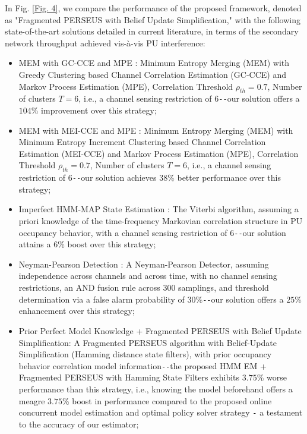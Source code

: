 \documentclass[12pt, draftcls, onecolumn]{IEEEtran}
\begin{document}
In Fig. \ref{Fig. 4}, we compare the performance of the proposed framework, denoted as "Fragmented PERSEUS with Belief Update Simplification," with the following state-of-the-art solutions detailed in current literature, in terms of the secondary network throughput achieved vis-à-vis PU interference:
\begin{itemize}
    \item MEM with GC-CCE and MPE \cite{WCL:7}: Minimum Entropy Merging (MEM) with Greedy Clustering based Channel Correlation Estimation (GC-CCE) and Markov Process Estimation (MPE), Correlation Threshold $\rho_{th}{=}0.7$, Number of clusters $T{=}6$, i.e., a channel sensing restriction of $6$\texttt{-{}-}our solution offers a $104$\% improvement over this strategy;
    \item MEM with MEI-CCE and MPE \cite{WCL:7}: Minimum Entropy Merging (MEM) with Minimum Entropy Increment Clustering based Channel Correlation Estimation (MEI-CCE) and Markov Process Estimation (MPE), Correlation Threshold $\rho_{th}{=}0.7$, Number of clusters $T{=}6$, i.e., a channel sensing restriction of $6$\texttt{-{}-}our solution achieves $38$\% better performance over this strategy;
    \item Imperfect HMM-MAP State Estimation \cite{WCL:6}: The Viterbi algorithm, assuming a priori knowledge of the time-frequency Markovian correlation structure in PU occupancy behavior, with a channel sensing restriction of $6$\texttt{-{}-}our solution attains a $6$\% boost over this strategy;
    \item Neyman-Pearson Detection \cite{WCL:11}: A Neyman-Pearson Detector, assuming independence across channels and across time, with no channel sensing restrictions, an AND fusion rule across $300$ samplings, and threshold determination via a false alarm probability of $30$\%\texttt{-{}-}our solution offers a $25$\% enhancement over this strategy;
    \item Prior Perfect Model Knowledge + Fragmented PERSEUS with Belief Update Simplification: A Fragmented PERSEUS algorithm with Belief-Update Simplification (Hamming distance state filters), with prior occupancy behavior correlation model information\texttt{-{}-}the proposed HMM EM + Fragmented PERSEUS with Hamming State Filters exhibits $3.75$\% worse performance than this strategy, i.e., knowing the model beforehand offers a meagre $3.75$\% boost in performance compared to the proposed online concurrent model estimation and optimal policy solver strategy \texttt{-} a testament to the accuracy of our estimator;

\end{itemize}
\end{document}
